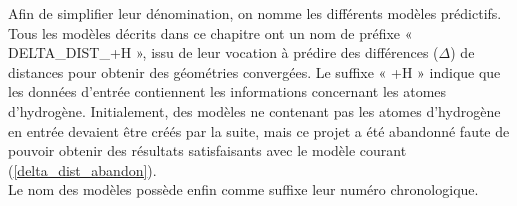 Afin de simplifier leur dénomination, on nomme les différents modèles prédictifs. Tous les modèles décrits dans ce chapitre ont un nom de préfixe « DELTA\_DIST\_+H », issu de leur vocation à prédire des différences ($\Delta$) de distances pour obtenir des géométries convergées. Le suffixe « +H » indique que les données d'entrée contiennent les informations concernant les atomes d'hydrogène. Initialement, des modèles ne contenant pas les atomes d'hydrogène en entrée devaient être créés par la suite, mais ce projet a été abandonné faute de pouvoir obtenir des résultats satisfaisants avec le modèle courant (\ref{delta_dist_abandon}).\\
Le nom des modèles possède enfin comme suffixe leur numéro chronologique.